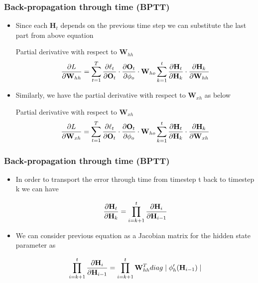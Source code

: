 \documentclass[
	11pt,
]{beamer}
\begin{document}
\begin{frame}
	\frametitle{Back-propagation through time (BPTT)}
	\begin{itemize}
		\item Since each $\mathbf{H}_t$ depends on the previous time step we can substitute the last part from above equation
	\begin{block}{Partial derivative with respect to $\mathbf{W}_{hh}$}
		\begin{equation*}
			\pdv{L}{\mathbf{W}_{hh}} = \sum_{t=1}^T \pdv{\ell_t}{\mathbf{O}_t} \cdot \pdv{\mathbf{O}_t}{\phi_o} \cdot \mathbf{W}_{ho} \sum_{k=1}^t \pdv{\mathbf{H}_t}{\mathbf{H}_k} \cdot \pdv{\mathbf{H}_k}{\mathbf{W}_{hh}}
		\end{equation*}
	\end{block}
		\item Similarly, we have the partial derivative with respect to $\mathbf{W}_{xh}$ as below
	\begin{block}{Partial derivative with respect to $\mathbf{W}_{xh}$}
		\begin{equation*}
			\pdv{L}{\mathbf{W}_{xh}} = \sum_{t=1}^T \pdv{\ell_t}{\mathbf{O}_t} \cdot \pdv{\mathbf{O}_t}{\phi_o} \cdot \mathbf{W}_{ho} \sum_{k=1}^t \pdv{\mathbf{H}_t}{\mathbf{H}_k} \cdot \pdv{\mathbf{H}_k}{\mathbf{W}_{xh}}
		\end{equation*}
	\end{block}
\end{itemize}
\end{frame}

\begin{frame}
	\frametitle{Back-propagation through time (BPTT)}
	\begin{itemize}
		\item In order to transport the error through time from timestep t back
		to timestep k we can have
	\begin{block}{}
		\begin{equation*}
			\pdv{\mathbf{H}_t}{\mathbf{H}_k} = \prod_{i = k + 1}^t \pdv{\mathbf{H}_i}{\mathbf{H}_{i-1}}
		\end{equation*}
	\end{block}
		\item We can consider previous equation as a Jacobian matrix for the hidden state parameter as
	\begin{block}{}
		\begin{equation*}
			\prod_{i = k + 1}^t \pdv{\mathbf{H}_i}{\mathbf{H}_{i-1}} = \prod_{i = k+1}^t \mathbf{W}_{hh}^T diag\mid \phi'_{h}(\mathbf{H}_{i-1})\mid
		\end{equation*}
	\end{block}
\end{itemize}
\end{frame}
\end{document}
